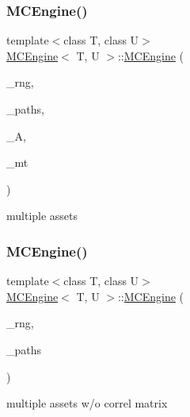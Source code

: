 \subsubsection{\texorpdfstring{M\+C\+Engine()}{MCEngine()}\hspace{0.1cm}{\footnotesize\ttfamily [2/4]}}
{\footnotesize\ttfamily template$<$class T, class U$>$ \\
\hyperlink{classMCEngine}{M\+C\+Engine}$<$ T, U $>$\+::\hyperlink{classMCEngine}{M\+C\+Engine} (\begin{DoxyParamCaption}\item[{T \&}]{\+\_\+rng,  }\item[{const \hyperlink{classMCEngine_a977f1048508a1467c496c2c47231d1d3}{paths} \&}]{\+\_\+paths,  }\item[{const Eigen\+::\+Matrix\+Xd \&}]{\+\_\+A,  }\item[{\hyperlink{mc__engine_8h_aac1fa89c4c60883790b2adb885048486}{mat\+Type}}]{\+\_\+mt }\end{DoxyParamCaption})\hspace{0.3cm}{\ttfamily [inline]}}



multiple assets 

\hypertarget{classMCEngine_a51e0bc14bc95f352654e7caaad78ecfb}{}\label{classMCEngine_a51e0bc14bc95f352654e7caaad78ecfb} 
\subsubsection{\texorpdfstring{M\+C\+Engine()}{MCEngine()}\hspace{0.1cm}{\footnotesize\ttfamily [3/4]}}
{\footnotesize\ttfamily template$<$class T, class U$>$ \\
\hyperlink{classMCEngine}{M\+C\+Engine}$<$ T, U $>$\+::\hyperlink{classMCEngine}{M\+C\+Engine} (\begin{DoxyParamCaption}\item[{T \&}]{\+\_\+rng,  }\item[{const \hyperlink{classMCEngine_a977f1048508a1467c496c2c47231d1d3}{paths} \&}]{\+\_\+paths }\end{DoxyParamCaption})\hspace{0.3cm}{\ttfamily [inline]}}



multiple assets w/o correl matrix 

\hypertarget{classMCEngine_a2341fbbbe2e92f91e4672757a1f8fea3}{}\label{classMCEngine_a2341fbbbe2e92f91e4672757a1f8fea3} 
